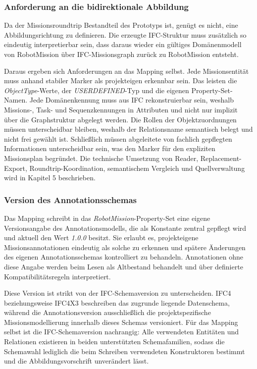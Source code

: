 \subsubsection{Anforderung an die bidirektionale Abbildung}
Da der Missionsroundtrip Bestandteil des Prototyps ist, genügt es nicht, eine Abbildungsrichtung zu
definieren. Die erzeugte IFC-Struktur muss zusätzlich so eindeutig interpretierbar sein, dass daraus
wieder ein gültiges Domänenmodell von RobotMission über IFC-Missionsgraph zurück zu RobotMission
entsteht.


Daraus ergeben sich Anforderungen an das Mapping selbst. Jede Missionsentität muss anhand stabiler
Marker als projekteigen erkennbar sein. Das leisten die \textit{ObjectType}-Werte, der
\textit{USERDEFINED}-Typ und die eigenen Property-Set-Namen. Jede Domänenkennung muss aus IFC
rekonstruierbar sein, weshalb Missions-, Task- und Sequenzkennungen in Attributen und nicht nur
implizit über die Graphstruktur abgelegt werden. Die Rollen der Objektzuordnungen müssen
unterscheidbar bleiben, weshalb der Relationsname semantisch belegt und nicht frei gewählt ist.
Schließlich müssen abgeleitete von fachlich gepflegten Informationen unterscheidbar sein, was den
Marker für den expliziten Missionsplan begründet. Die technische Umsetzung von Reader,
Replacement-Export, Roundtrip-Koordination, semantischem Vergleich und Quellverwaltung wird in
Kapitel 5 beschrieben.

\subsubsection{Version des Annotationsschemas}

Das Mapping schreibt in das \textit{RobotMission}-Property-Set eine eigene Versionsangabe des
Annotationsmodells, die als Konstante zentral gepflegt wird und aktuell den Wert \textit{1.0.0}
besitzt. Sie erlaubt es, projekteigene Missionsannotationen eindeutig als solche zu erkennen und
spätere Änderungen des eigenen Annotationsschemas kontrolliert zu behandeln. Annotationen ohne diese
Angabe werden beim Lesen als Altbestand behandelt und über definierte Kompatibilitätsregeln
interpretiert.

Diese Version ist strikt von der IFC-Schemaversion zu unterscheiden. IFC4 beziehungsweise IFC4X3
beschreiben das zugrunde liegende Datenschema, während die Annotationsversion ausschließlich die
projektspezifische Missionsmodellierung innerhalb dieses Schemas versioniert. Für das Mapping selbst
ist die IFC-Schemaversion nachrangig: Alle verwendeten Entitäten und Relationen existieren in beiden
unterstützten Schemafamilien, sodass die Schemawahl lediglich die beim Schreiben verwendeten
Konstruktoren bestimmt und die Abbildungsvorschrift unverändert lässt.

